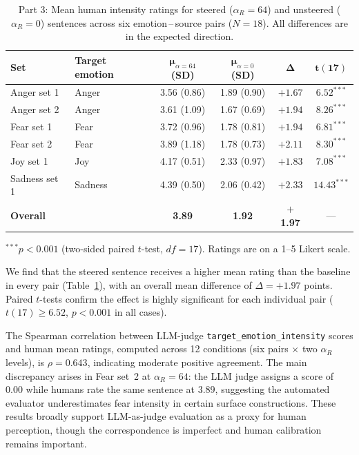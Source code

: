 \begin{table}[H]
\centering
\small
\begin{threeparttable}
\begin{tabular}{llcccc}
\toprule
\textbf{Set} & \textbf{Target emotion} & $\boldsymbol{\mu}_{\alpha=64}$ \textbf{(SD)} & $\boldsymbol{\mu}_{\alpha=0}$ \textbf{(SD)} & $\boldsymbol{\Delta}$ & $\boldsymbol{t(17)}$ \\
\midrule
Anger set 1 & Anger   & 3.56 (0.86) & 1.89 (0.90) & $+1.67$ & $6.52^{***}$ \\
Anger set 2 & Anger   & 3.61 (1.09) & 1.67 (0.69) & $+1.94$ & $8.26^{***}$ \\
Fear set 1  & Fear    & 3.72 (0.96) & 1.78 (0.81) & $+1.94$ & $6.81^{***}$ \\
Fear set 2  & Fear    & 3.89 (1.18) & 1.78 (0.73) & $+2.11$ & $8.30^{***}$ \\
Joy set 1   & Joy     & 4.17 (0.51) & 2.33 (0.97) & $+1.83$ & $7.08^{***}$ \\
Sadness set 1 & Sadness & 4.39 (0.50) & 2.06 (0.42) & $+2.33$ & $14.43^{***}$ \\
\midrule
\textbf{Overall} & & \textbf{3.89} & \textbf{1.92} & $+$\textbf{1.97} & --- \\
\bottomrule
\end{tabular}
\begin{tablenotes}
\small
\item $^{***}p < 0.001$ (two-sided paired $t$-test, $\mathit{df}=17$). Ratings are on a 1--5 Likert scale.
\end{tablenotes}
\end{threeparttable}
\caption{Part 3: Mean human intensity ratings for steered ($\alpha_R = 64$) and unsteered ($\alpha_R = 0$) sentences across six emotion\,--\,source pairs ($N = 18$). All differences are in the expected direction.}
\label{tab:human_eval_p3}
\end{table}

We find that the steered sentence receives a higher mean rating than the baseline in every pair (Table~\ref{tab:human_eval_p3}), with an overall mean difference of $\Delta = +1.97$ points. Paired $t$-tests confirm the effect is highly significant for each individual pair ($t(17) \geq 6.52$, $p < 0.001$ in all cases).\par

The Spearman correlation between LLM-judge \texttt{target\_emotion\_intensity} scores and human mean ratings, computed across 12 conditions (six pairs $\times$ two $\alpha_R$ levels), is $\rho = 0.643$, indicating moderate positive agreement. The main discrepancy arises in Fear set~2 at $\alpha_R = 64$: the LLM judge assigns a score of $0.00$ while humans rate the same sentence at $3.89$, suggesting the automated evaluator underestimates fear intensity in certain surface constructions. These results broadly support LLM-as-judge evaluation as a proxy for human perception, though the correspondence is imperfect and human calibration remains important.\par

